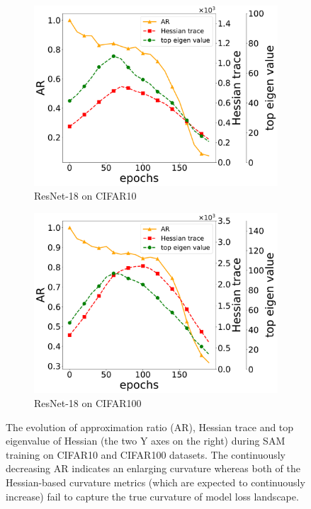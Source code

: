 \documentclass[letterpaper]{article} %
\theoremstyle{plain}
\theoremstyle{definition}
\begin{document}
\begin{figure}[t!]
   \centering
   \begin{subfigure}[b]{0.4\textwidth}
     \centering
     \includegraphics[width=\textwidth]{figs/cifar10_effectiveness.pdf}
     \caption{ResNet-18 on CIFAR10}
     \label{subfig:cifar10}
   \end{subfigure}
   \hspace{0.05\textwidth}
   \begin{subfigure}[b]{0.4\textwidth}
     \centering
     \includegraphics[width=\textwidth]{figs/cifar100_effectiveness.pdf}
     \caption{ResNet-18 on CIFAR100}
     \label{subfig:cifar100}
   \end{subfigure}
\caption{\footnotesize The evolution of approximation ratio (AR), Hessian trace and top eigenvalue of Hessian (the two Y axes on the right) during SAM training on CIFAR10 and CIFAR100 datasets. The continuously decreasing AR indicates an enlarging curvature whereas both of the Hessian-based curvature metrics (which are expected to continuously increase) fail to capture the true curvature of model loss landscape.}
\label{fig:AR}
\end{figure}
\end{document}
